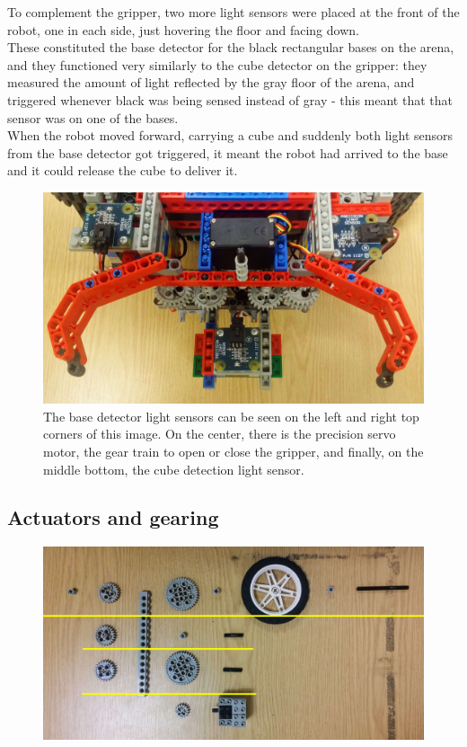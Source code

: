 To complement the gripper, two more light sensors were placed at the front of the robot, one in each side, just hovering the floor and facing down.\\
These constituted the base detector for the black rectangular bases on the arena, and they functioned very similarly to the cube detector on the gripper: they measured the amount of light reflected by the gray floor of the arena, and triggered whenever black was being sensed instead of gray - this meant that that sensor was on one of the bases.\\
When the robot moved forward, carrying a cube and suddenly both light sensors from the base detector got triggered, it meant the robot had arrived to the base and it could release the cube to deliver it.

\begin{figure}[ht]
    \centering
    \includegraphics[width=0.7\linewidth]{res/robot-pics/base-detector-and-gripper.jpg}
    \caption{The base detector light sensors can be seen on the left and right top corners of this image. On the center, there is the precision servo motor, the gear train to open or close the gripper, and finally, on the middle bottom, the cube detection light sensor.}
    \label{fig:base-detector-and-gripper}
\end{figure}


\subsection{Actuators and gearing}

\begin{figure}[ht]
    \centering
    \includegraphics[width=0.7\linewidth]{res/robot-pics/gear-train-unmounted.jpg}
    \caption{}
    \label{fig:}
\end{figure}

